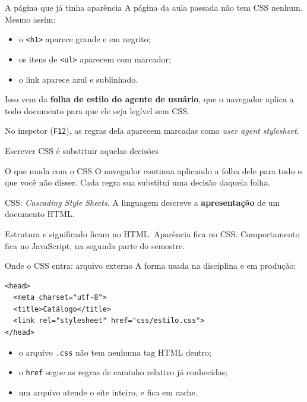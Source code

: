 \documentclass{beamer}
\begin{document}
\begin{frame}{A página que já tinha aparência}
	A página da aula passada não tem CSS nenhum. Mesmo assim:

	\begin{itemize}
		\item o \texttt{<h1>} aparece grande e em negrito;
		\item os itens de \texttt{<ul>} aparecem com marcador;
		\item o link aparece azul e sublinhado.
	\end{itemize}

	\vspace{0.4cm}
	Isso vem da \textbf{folha de estilo do agente de usuário}, que o navegador
	aplica a todo documento para que ele seja legível sem CSS.

	\vspace{0.3cm}
	No inspetor (\texttt{F12}), as regras dela aparecem marcadas como
	\emph{user agent stylesheet}.
\end{frame}

\begin{frame}{Escrever CSS é substituir aquelas decisões}
	\begin{block}{O que muda com o CSS}
		O navegador continua aplicando a folha dele para tudo o que você não disser.
		Cada regra sua substitui uma decisão daquela folha.
	\end{block}

	\vspace{0.5cm}
	CSS: \emph{Cascading Style Sheets}. A linguagem descreve a
	\textbf{apresentação} de um documento HTML.

	\vspace{0.3cm}
	Estrutura e significado ficam no HTML. Aparência fica no CSS. Comportamento
	fica no JavaScript, na segunda parte do semestre.
\end{frame}

\begin{frame}[fragile]{Onde o CSS entra: arquivo externo}
	A forma usada na disciplina e em produção:

	\begin{verbatim}
<head>
  <meta charset="utf-8">
  <title>Catálogo</title>
  <link rel="stylesheet" href="css/estilo.css">
</head>
  \end{verbatim}

	\vspace{0.3cm}
	\begin{itemize}
		\item o arquivo \texttt{.css} não tem nenhuma tag HTML dentro;
		\item o \texttt{href} segue as regras de caminho relativo já conhecidas;
		\item um arquivo atende o site inteiro, e fica em cache.
	\end{itemize}
\end{frame}
\end{document}
